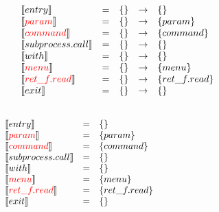 \begin{frame}
\[
\begin{array}{lclcl}
  \constraint{entry} & = & \{\} & \rightarrow & \{\}\\
  \assignconstraint{param} & = & \{\} & \rightarrow &\{param\}\\
  \assignconstraint{command} & = & \{\}& \rightarrow &\{command\}\\
  \constraint{subprocess.call} & = & \{\}& \rightarrow &\{\}\\
  \constraint{with} & = & \{\}&\rightarrow & \{\}\\
  \assignconstraint{menu} & = & \{\}& \rightarrow & \{menu\}\\
  \assignconstraint{ret\_f.read} & = & \{\}&\rightarrow & \{ret\_f.read\}\\
  \constraint{exit} & = & \{\}&\rightarrow & \{\}\\
  && && \phantom{\{command, param\}\{command, param\}}
\end{array}
\]
\end{frame}

\begin{frame}
\[
\begin{array}{lclcl}
  \constraint{entry} & = &  \{\} & \phantom{\rightarrow} & \phantom{hahahaha}\\
  \assignconstraint{param} & = & \{param\}&  & \\ 
  \assignconstraint{command} & = &\{command\}&  & \\
  \constraint{subprocess.call} & = & \{\}&  & \\
  \constraint{with} & = & \{\}&  & \\
  \assignconstraint{menu} & = &  \{menu\}&  & \\
  \assignconstraint{ret\_f.read} & = & \{ret\_f.read\}&  & \\
  \constraint{exit} & = & \{\}&  & \\
  && && \phantom{\{command, param\} \{command, param\}}
\end{array}
\]
\end{frame}

